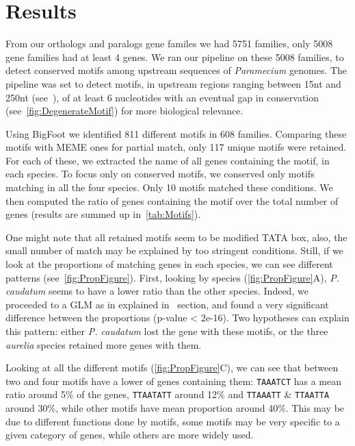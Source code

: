 \section*{Results}
\label{sec:Results}

From our orthologs and paralogs gene familes we had 5751 families, only 5008 gene families had at least 4 genes. We ran our pipeline on these 5008 families, to detect conserved motifs among upstream sequences of \textit{Paramecium} genomes. The pipeline was set to detect motifs, in upstream regions ranging between 15nt and 250nt (see~), of at least 6 nucleotides with an eventual gap in conservation (see~\autoref{fig:DegenerateMotif}) for more biological relevance.

Using BigFoot we identified 811 different motifs in 608 families. Comparing these motifs with MEME ones for partial match, only 117 unique motifs were retained. For each of these, we extracted the name of all genes containing the motif, in each species. To focus only on conserved motifs, we conserved only motifs matching in all the four species. Only 10 motifs matched these conditions. We then computed the ratio of genes containing the motif over the total number of genes (results are summed up in~\autoref{tab:Motifs}).

One might note that all retained motifs seem to be modified TATA box, also, the small number of match may be explained by too stringent conditions. Still, if we look at the proportions of matching genes in each species, we can see different patterns (see~\autoref{fig:PropFigure}). First, looking by species (\autoref{fig:PropFigure}A), \textit{P. caudatum} seems to have a lower ratio than the other species. Indeed, we proceeded to a GLM as in explained in~ section, and found a very significant difference between the proportions (p-value < 2e-16). Two hypotheses can explain this pattern: either \textit{P. caudatum} lost the gene with these motifs, or the three \textit{aurelia} species retained more genes with them.

Looking at all the different motifs (\autoref{fig:PropFigure}C), we can see that between two and four motifs have a lower of genes containing them: \texttt{TAAATCT} has a mean ratio around 5\% of the genes, \texttt{TTAATATT} around 12\% and \texttt{TTAAATT} \& \texttt{TTAATTA} around 30\%, while other motifs have mean proportion around 40\%. This may be due to different functions done by motifs, some motifs may be very specific to a given category of genes, while others are more widely used.

